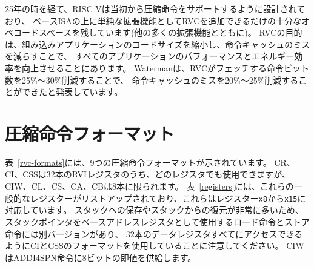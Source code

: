 \begin{commentary}
25年の時を経て、RISC-Vは当初から圧縮命令をサポートするように設計されており、
ベースISAの上に単純な拡張機能としてRVCを追加できるだけの十分なオペコードスペースを残しています(他の多くの拡張機能とともに)。
RVCの目的は、組み込みアプリケーションのコードサイズを縮小し、命令キャッシュのミスを減らすことで、
すべてのアプリケーションのパフォーマンスとエネルギー効率を向上させることにあります。
Watermanは、RVCがフェッチする命令ビット数を25\%～30\%削減することで、
命令キャッシュのミスを20\%～25\%削減することができたと発表しています。
\end{commentary}

\begin{comment}
\section{Compressed Instruction Formats}
\end{comment}
\section{圧縮命令フォーマット}

\begin{comment}
Table~\ref{rvc-formats} shows the nine compressed instruction
formats. CR, CI, and CSS can use any of the 32 RVI registers, but CIW,
CL, CS, CA, and CB are limited to just 8 of them. Table~\ref{registers}
lists these popular registers, which correspond to registers {\tt x8}
to {\tt x15}.  Note that there is a
separate version of load and store instructions that use the stack
pointer as the base address register, since saving to and restoring
from the stack are so prevalent, and that they use the CI and CSS
formats to allow access to all 32 data registers. CIW supplies an
8-bit immediate for the ADDI4SPN instruction.
\end{comment}

表~\ref{rvc-formats}には、9つの圧縮命令フォーマットが示されています。
CR、CI、CSSは32本のRVIレジスタのうち、どのレジスタでも使用できますが、
CIW、CL、CS、CA、CBは8本に限られます。
表~\ref{registers}には、これらの一般的なレジスターがリストアップされており、これらはレジスター{\tt x8}から{\tt x15}に対応しています。
スタックへの保存やスタックからの復元が非常に多いため、スタックポインタをベースアドレスレジスタとして使用するロード命令とストア命令には別バージョンがあり、
32本のデータレジスタすべてにアクセスできるようにCIとCSSのフォーマットを使用していることに注意してください。
CIWはADDI4SPN命令に8ビットの即値を供給します。

